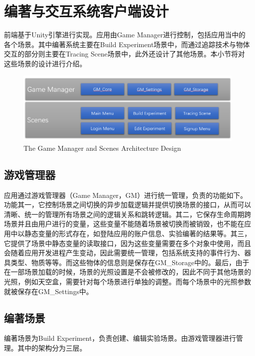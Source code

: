 \section{编著与交互系统客户端设计}
前端基于Unity引擎进行实现。应用由Game Manager进行控制，包括应用当中的各个场景。其中编著系统主要在Build Experiment场景中，而通过追踪技术与物体交互的部分则主要在Tracing Scene场景中，此外还设计了其他场景。本小节将对这些场景的设计进行介绍。

\begin{figure}[!htp]
  \centering
  \includegraphics[width=12cm]{figure/GMarc.png}
    {The Game Manager and Scenes Architecture Design}
 \label{fig:gm}
\end{figure}

\subsection{游戏管理器}
应用通过游戏管理器（Game Manager，GM）进行统一管理，负责的功能如下。
功能其一，它控制场景之间切换的异步加载逻辑并提供切换场景的接口，从而可以清晰、统一的管理所有场景之间的逻辑关系和跳转逻辑。其二，它保存生命周期跨场景并且由用户进行的变量，这些变量不能随着场景被切换而被销毁，也不能在应用中以静态变量的形式存在，如登陆应用的账户信息、实验编著的结果等。其三，它提供了场景中静态变量的读取接口，因为这些变量需要在多个对象中使用，而且会随着应用开发进程产生变动，因此需要统一管理，包括系统支持的事件行为、器具类型、物质等等。而这些物体的信息则是保存在GM\_Storage中的。最后，由于在一部场景加载的时候，场景的光照设置是不会被修改的，因此不同于其他场景的光照，例如天空盒，需要针对每个场景进行单独的调整。而每个场景中的光照参数就被保存在GM\_Settings中。

\subsection{编著场景}
编著场景为Build Experiment，负责创建、编辑实验场景。由游戏管理器进行管理。其中的架构分为三层。

